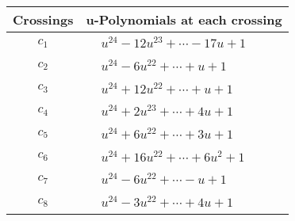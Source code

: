 \documentclass[1p]{elsarticle_modified}
\theoremstyle{definition}
\begin{document}
\begin{tabular}{m{50pt}|m{274pt}}
Crossings & \hspace{64pt}u-Polynomials at each crossing \\
\hline $$\begin{aligned}c_{1}\end{aligned}$$&$\begin{aligned}
&u^{24}-12 u^{23}+\cdots-17 u+1
\end{aligned}$\\
\hline $$\begin{aligned}c_{2}\end{aligned}$$&$\begin{aligned}
&u^{24}-6 u^{22}+\cdots+u+1
\end{aligned}$\\
\hline $$\begin{aligned}c_{3}\end{aligned}$$&$\begin{aligned}
&u^{24}+12 u^{22}+\cdots+u+1
\end{aligned}$\\
\hline $$\begin{aligned}c_{4}\end{aligned}$$&$\begin{aligned}
&u^{24}+2 u^{23}+\cdots+4 u+1
\end{aligned}$\\
\hline $$\begin{aligned}c_{5}\end{aligned}$$&$\begin{aligned}
&u^{24}+6 u^{22}+\cdots+3 u+1
\end{aligned}$\\
\hline $$\begin{aligned}c_{6}\end{aligned}$$&$\begin{aligned}
&u^{24}+16 u^{22}+\cdots+6 u^2+1
\end{aligned}$\\
\hline $$\begin{aligned}c_{7}\end{aligned}$$&$\begin{aligned}
&u^{24}-6 u^{22}+\cdots- u+1
\end{aligned}$\\
\hline $$\begin{aligned}c_{8}\end{aligned}$$&$\begin{aligned}
&u^{24}-3 u^{22}+\cdots+4 u+1
\end{aligned}$\\

\end{tabular}
\end{document}

